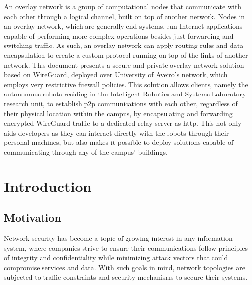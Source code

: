 \documentclass[11pt,twoside,a4paper]{report}
\begin{document}
\TitlePage
  \vspace*{55mm}
       {An overlay network is a group of computational nodes that communicate with each other through a logical channel, built on top of another network. Nodes in an overlay network, which are generally end systems, run Internet applications capable of performing more complex operations besides just forwarding and switching traffic. As such, an overlay network can apply routing rules and data encapsulation to create a custom protocol running on top of the links of another network. This document presents a secure and private overlay network solution based on WireGuard, deployed over University of Aveiro's network, which employs very restrictive firewall policies. This solution allows clients, namely the autonomous robots residing in the Intelligent Robotics and Systems Laboratory research unit, to establish \ac{p2p} communications with each other, regardless of their physical location within the campus, by encapsulating and forwarding encrypted WireGuard traffic to a dedicated relay server as \ac{http}. This not only aids developers as they can interact directly with the robots through their personal machines, but also makes it possible to deploy solutions capable of communicating through any of the campus' buildings.}
\EndTitlePage
\titlepage\ \endtitlepage %


%
%
\tableofcontents

\cleardoublepage
\listoffigures

\cleardoublepage
\listoftables

\cleardoublepage


\cleardoublepage
{}
\chapter{Introduction}

\section{Motivation}

Network security has become a topic of growing interest in any information system, where companies strive to ensure their communications follow principles of integrity and confidentiality while minimizing attack vectors that could compromise services and data. With such goals in mind, network topologies are subjected to traffic constraints and security mechanisms to secure their systems.
\end{document}
